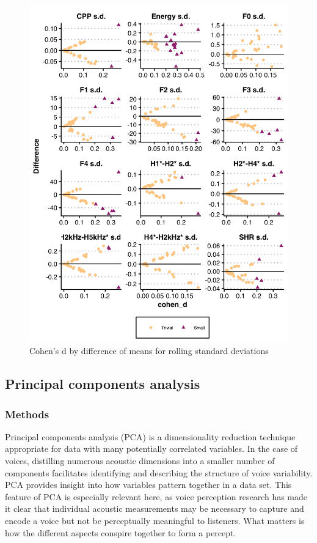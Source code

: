 \begin{figure}[htbp]
    \begin{center}
    \includegraphics[width=\linewidth]{figures/ch3_cohend_part2_5in.png} 
    \caption{Cohen's d by difference of means for rolling standard deviations}
    \label{ch3:fig:cohendsd}
    \end{center}
\end{figure}

\subsection{Principal components analysis}\label{ch3:sec:pca}
\subsubsection{Methods}
Principal components analysis (PCA) is a dimensionality reduction technique appropriate for data with many potentially correlated variables. In the case of voices, distilling numerous acoustic dimensions into a smaller number of components facilitates identifying and describing the structure of voice variability. PCA provides insight into how variables pattern together in a data set. This feature of PCA is especially relevant here, as voice perception research has made it clear that individual acoustic measurements may be necessary to capture and encode a voice but not be perceptually meaningful to listeners. What matters is how the different aspects conspire together to form a percept. 

